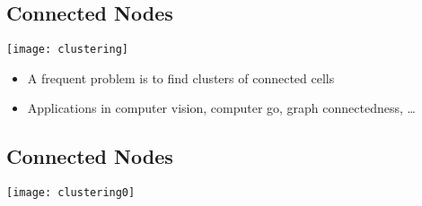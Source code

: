 \Outline

\begin{slide}
\section{Connected Nodes}
\begin{minipage}{0.5\linewidth}
\vfill
\texttt{[image: clustering]}
\vfill
\end{minipage}\hfil%
\begin{minipage}{0.45\linewidth}
\begin{PauseHighLight}
  \begin{itemize}
  \item A frequent problem is to find clusters of connected cells\pause
  \item Applications in computer vision, computer go, graph
    connectedness, \ldots\pause
  \end{itemize}
\end{PauseHighLight}

\end{minipage}

\end{slide}



\begin{slide}
\section[-2]{Connected Nodes}

\pb
\pause
\begin{center}
  \texttt{[image: clustering0]}
\end{center}

\end{slide}


